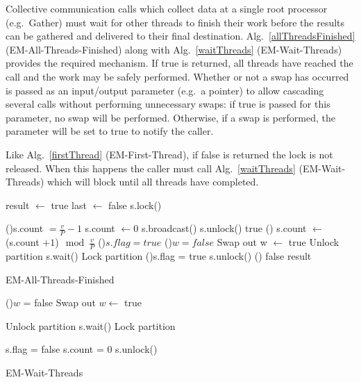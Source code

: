 \documentclass[12pt]{carletoncsthesis}
\begin{document}
Collective communication calls which collect data at a single root processor
(e.g.\ Gather) must wait for other threads to finish their work before
the results can be gathered and delivered to their final destination.
Alg.~\ref{allThreadsFinished} ({\sc EM-All-Threads-Finished}) along with
Alg.~\ref{waitThreads} ({\sc EM-Wait-Threads}) provides the required mechanism.
If true is returned, all threads have reached the call and the work may
be safely performed.  Whether or not a swap has occurred is passed as an
input/output parameter (e.g.\ a pointer) to allow cascading several calls
without performing unnecessary swaps: if true is passed for this parameter,
no swap will be performed.  Otherwise, if a swap is performed, the
parameter will be set to true to notify the caller.  

Like Alg.~\ref{firstThread} ({\sc EM-First-Thread}), if false is returned
the lock is not released.  When this happens the caller must call
Alg.~\ref{waitThreads} ({\sc EM-Wait-Threads}) which will block until all
threads have completed.

\begin{algorithm}[h]
	\BlankLine
	result $\longleftarrow$ true\;
	last $\longleftarrow$ false\;
	s.lock()\;

	\If(){s.count $= \frac{v}{P} - 1$}{
		s.count $\longleftarrow 0$\;
		s.broadcast()\;
		s.unlock()\;
		\Return true\;
	}\Else(){
		s.count $\longleftarrow$ (s.count $+ 1$)$\mod \frac{v}{P}$\;
		\If(){$s.flag = true$}{
			\If(){$w = false$}{
				Swap out\;
				w $\longleftarrow$ true\;
			}
			Unlock partition\;
			s.wait()\;
			Lock partition\;
		}
		\If(){s.flag = true}{
			s.unlock()\;
		}\Else(){
			\Return false\;
		}
	}
	\Return result\;
	\caption{\sc EM-All-Threads-Finished}
	\label{allThreadsFinished}
\end{algorithm}

\begin{algorithm}[h]
	\BlankLine
	\If(){$w$ = false}{
		Swap out\;
		$w \longleftarrow$ true\;
	}
	
	\BlankLine
	Unlock partition\;
	s.wait()\;
	Lock partition\;

	\BlankLine
	s.flag = false\;
	s.count = 0\;
	s.unlock()\;
	\caption{\sc EM-Wait-Threads}
	\label{waitThreads}
\end{algorithm}
\end{document}
